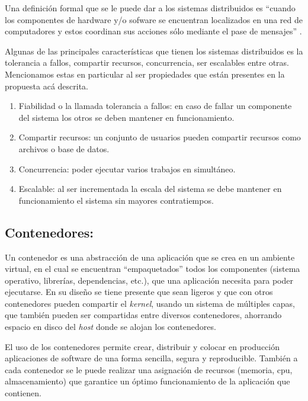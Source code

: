 \documentclass[
  10,
  spanish,
  openany]{book}
\begin{document}
Una definición formal que se le puede dar a los sistemas distribuidos es ``cuando los componentes de hardware y/o sofware se encuentran localizados en una red de computadores y estos coordinan sus acciones sólo mediante el pase de mensajes'' \citep{distribu2012}.

Algunas de las principales características que tienen los sistemas distribuidos es la tolerancia a fallos, compartir recursos, concurrencia, ser escalables \citep{czaja2018} entre otras. Mencionamos estas en particular al ser propiedades que están presentes en la propuesta acá descrita.

\begin{enumerate}
\def\labelenumi{\arabic{enumi}.}
\item
  Fiabilidad o la llamada tolerancia a fallos: en caso de fallar un componente del sistema los otros se deben mantener en funcionamiento.
\item
  Compartir recursos: un conjunto de usuarios pueden compartir recursos como archivos o base de datos.
\item
  Concurrencia: poder ejecutar varios trabajos en simultáneo.
\item
  Escalable: al ser incrementada la escala del sistema se debe mantener en funcionamiento el sistema sin mayores contratiempos.
\end{enumerate}

\hypertarget{contenedores}{%
\subsection{Contenedores:}\label{contenedores}}

Un contenedor es una abstracción de una aplicación que se crea en un ambiente virtual, en el cual se encuentran ``empaquetados'' todos los componentes (sistema operativo, librerías, dependencias, etc.), que una aplicación necesita para poder ejecutarse. En su diseño se tiene presente que sean ligeros y que con otros contenedores pueden compartir el \emph{kernel}, usando un sistema de múltiples capas, que también pueden ser compartidas entre diversos contenedores, ahorrando espacio en disco del \emph{host} donde se alojan los contenedores.

El uso de los contenedores permite crear, distribuir y colocar en producción aplicaciones de software de una forma sencilla, segura y reproducible. También a cada contenedor se le puede realizar una asignación de recursos (memoria, cpu, almacenamiento) que garantice un óptimo funcionamiento de la aplicación que contienen.
\end{document}
